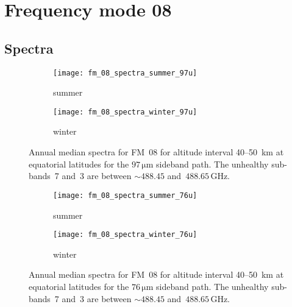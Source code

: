\section{Frequency mode 08}
\label{FM08}

\subsection{Spectra}
\label{FM08:spectra}

\begin{figure}[ht]
    \centering
    \begin{subfigure}[b]{0.9545\textwidth}
        \texttt{[image: fm\_08\_spectra\_summer\_97u]}
        \caption{summer}\label{fig:spectra:08:summer:97u}
    \end{subfigure}
    \begin{subfigure}[b]{0.9545\textwidth}
        \texttt{[image: fm\_08\_spectra\_winter\_97u]}
        \caption{winter}\label{fig:spectra:08:winter:97u}
    \end{subfigure}
    \caption{Annual median spectra for FM~08 for altitude interval 40--50~km at
        equatorial latitudes for the $97\,\mathrm{\mu m}$ sideband path. The
        unhealthy sub-bands~7 and~3 are between $\sim488.45$
        and~$488.65\,\mathrm{GHz}$.
        }\label{fig:spectra:08:97u}
\end{figure}

\begin{figure}[ht]
    \centering
    \begin{subfigure}[b]{0.9545\textwidth}
        \texttt{[image: fm\_08\_spectra\_summer\_76u]}
        \caption{summer}\label{fig:spectra:08:summer:76u}
    \end{subfigure}
    \begin{subfigure}[b]{0.9545\textwidth}
        \texttt{[image: fm\_08\_spectra\_winter\_76u]}
        \caption{winter}\label{fig:spectra:08:winter:76u}
    \end{subfigure}
    \caption{Annual median spectra for FM~08 for altitude interval 40--50~km at
        equatorial latitudes for the $76\,\mathrm{\mu m}$ sideband path. The
        unhealthy sub-bands~7 and~3 are between $\sim488.45$
        and~$488.65\,\mathrm{GHz}$.
        }\label{fig:spectra:08:76u}
\end{figure}

